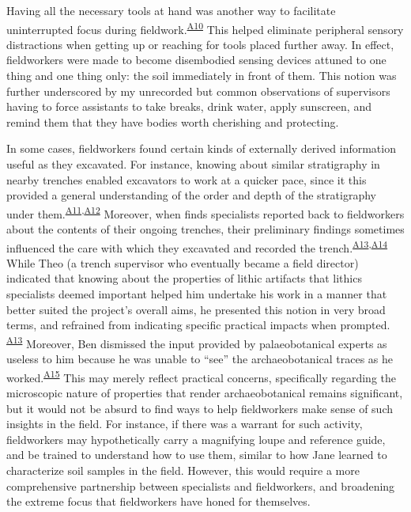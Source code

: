 \documentclass{article}
\begin{document}
Having all the necessary tools at hand was another way to facilitate
uninterrupted focus during
fieldwork.\textsuperscript{\hyperref[sec-A10]{A10}} This helped
eliminate peripheral sensory distractions when getting up or reaching
for tools placed further away. In effect, fieldworkers were made to
become disembodied sensing devices attuned to one thing and one thing
only: the soil immediately in front of them. This notion was further
underscored by my unrecorded but common observations of supervisors
having to force assistants to take breaks, drink water, apply sunscreen,
and remind them that they have bodies worth cherishing and protecting.

In some cases, fieldworkers found certain kinds of externally derived information useful as
they excavated. For instance, knowing about similar stratigraphy in
nearby trenches enabled excavators to work at a quicker pace, since it
this provided a general understanding of the order and depth of the
stratigraphy under
them.\textsuperscript{\hyperref[sec-A11]{A11},\hyperref[sec-A12]{A12}}
Moreover, when finds specialists reported back to fieldworkers about the
contents of their ongoing trenches, their preliminary findings sometimes
influenced the care with which they excavated and recorded the
trench.\textsuperscript{\hyperref[sec-A13]{A13},\hyperref[sec-A14]{A14}}
While Theo (a trench supervisor who eventually became a field director)
indicated that knowing about the properties of lithic artifacts that
lithics specialists deemed important helped him undertake his work in a
manner that better suited the project's overall aims, he presented this
notion in very broad terms, and refrained from indicating specific
practical impacts when prompted.
\textsuperscript{\hyperref[sec-A13]{A13}} Moreover, Ben dismissed the
input provided by palaeobotanical experts as useless to him because he
was unable to ``see'' the archaeobotanical traces as he
worked.\textsuperscript{\hyperref[sec-A15]{A15}} This may merely reflect
practical concerns, specifically regarding the microscopic nature of
properties that render archaeobotanical remains significant, but it
would not be absurd to find ways to help fieldworkers make sense of such
insights in the field. For instance, if there was a warrant for such
activity, fieldworkers may hypothetically carry a magnifying loupe and
reference guide, and be trained to understand how to use them, similar
to how Jane learned to characterize soil samples in the field. However,
this would require a more comprehensive partnership between specialists
and fieldworkers, and broadening the extreme focus that fieldworkers
have honed for themselves.
\end{document}
